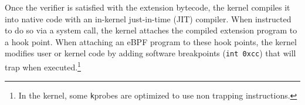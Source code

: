 
Once the verifier is satisfied with the extension bytecode, the kernel compiles it into native code with an in-kernel just-in-time (JIT) compiler.  When instructed to do so via a system call, the kernel attaches the compiled extension program to a hook point.
When attaching an eBPF program to these hook points, the kernel modifies user or kernel code by adding software breakpoints (\ie \texttt{int 0xcc}) that will trap when executed.\footnote{In the kernel, some {\texttt kprobe}s are
optimized to use non trapping instructions.}



